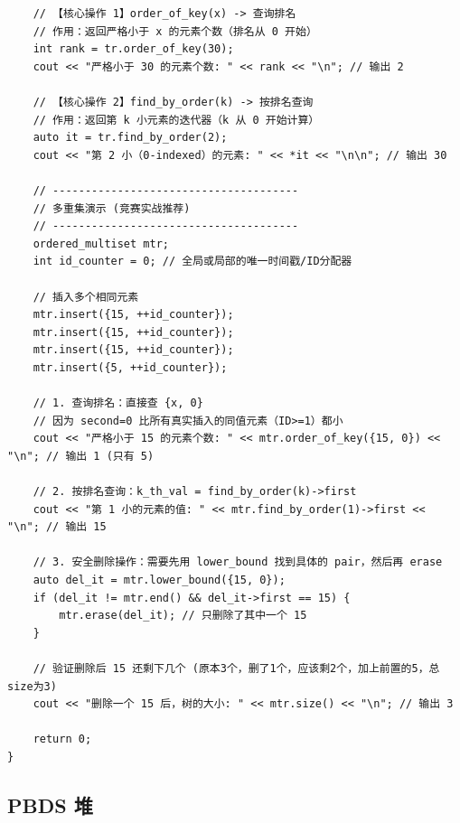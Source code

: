 \begin{lstlisting}
    // 【核心操作 1】order_of_key(x) -> 查询排名
    // 作用：返回严格小于 x 的元素个数（排名从 0 开始）
    int rank = tr.order_of_key(30); 
    cout << "严格小于 30 的元素个数: " << rank << "\n"; // 输出 2

    // 【核心操作 2】find_by_order(k) -> 按排名查询
    // 作用：返回第 k 小元素的迭代器（k 从 0 开始计算）
    auto it = tr.find_by_order(2); 
    cout << "第 2 小（0-indexed）的元素: " << *it << "\n\n"; // 输出 30

    // --------------------------------------
    // 多重集演示 (竞赛实战推荐)
    // --------------------------------------
    ordered_multiset mtr;
    int id_counter = 0; // 全局或局部的唯一时间戳/ID分配器

    // 插入多个相同元素
    mtr.insert({15, ++id_counter});
    mtr.insert({15, ++id_counter});
    mtr.insert({15, ++id_counter});
    mtr.insert({5, ++id_counter});

    // 1. 查询排名：直接查 {x, 0}
    // 因为 second=0 比所有真实插入的同值元素（ID>=1）都小
    cout << "严格小于 15 的元素个数: " << mtr.order_of_key({15, 0}) << "\n"; // 输出 1 (只有 5)

    // 2. 按排名查询：k_th_val = find_by_order(k)->first
    cout << "第 1 小的元素的值: " << mtr.find_by_order(1)->first << "\n"; // 输出 15

    // 3. 安全删除操作：需要先用 lower_bound 找到具体的 pair，然后再 erase
    auto del_it = mtr.lower_bound({15, 0});
    if (del_it != mtr.end() && del_it->first == 15) {
        mtr.erase(del_it); // 只删除了其中一个 15
    }

    // 验证删除后 15 还剩下几个 (原本3个，删了1个，应该剩2个，加上前置的5，总size为3)
    cout << "删除一个 15 后，树的大小: " << mtr.size() << "\n"; // 输出 3

    return 0;
}
\end{lstlisting}

\subsection{PBDS 堆}

